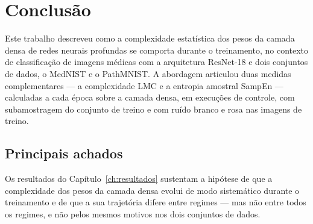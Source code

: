 
\chapter{Conclusão}
\label{ch:conclusao}

Este trabalho descreveu como a complexidade estatística dos pesos da camada
densa de redes neurais profundas se comporta durante o treinamento, no contexto
de classificação de imagens médicas com a arquitetura ResNet-18 e dois
conjuntos de dados, o MedNIST e o PathMNIST. A abordagem articulou duas medidas complementares --- a complexidade
LMC \cite{lmc1995} e a entropia amostral SampEn \cite{richman2000} ---
calculadas a cada época sobre a camada densa, em execuções de controle, com
subamostragem do conjunto de treino e com ruído branco e rosa nas imagens de
treino.

\section{Principais achados}
\label{sec:conc-achados}

Os resultados do Capítulo~\ref{ch:resultados} sustentam a hipótese de que a
complexidade dos pesos da camada densa evolui de modo sistemático durante o
treinamento e de que a sua trajetória difere entre regimes --- mas não entre
todos os regimes, e não pelos mesmos motivos nos dois conjuntos de dados.

